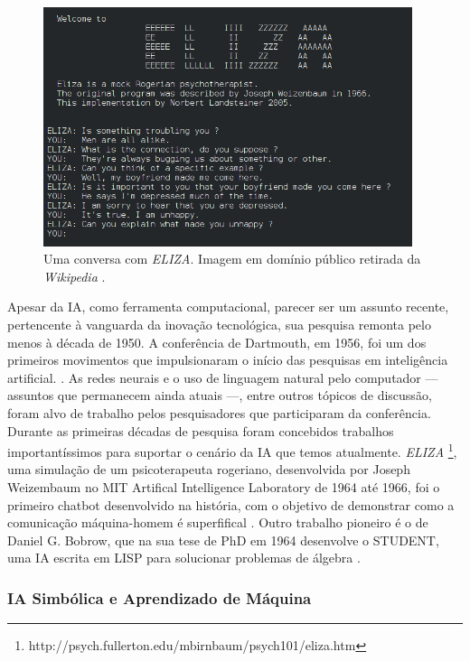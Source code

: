 \documentclass[12pt, a4paper]{article}
\begin{document}
\begin{figure}[ht!]
	\centering
	\includegraphics[width=\textwidth, height=7cm, keepaspectratio=true]{fig/eliza}
	\caption{
		Uma conversa com \emph{ELIZA}. Imagem em domínio público retirada da \emph{Wikipedia}
		\cite{wikipedia_eliza}.
	}
\end{figure}

Apesar da IA, como ferramenta computacional, parecer ser um assunto recente, 
pertencente à vanguarda da inovação tecnológica, sua pesquisa
remonta pelo menos à década de 1950.
A conferência de Dartmouth, em 1956, foi um dos primeiros movimentos que impulsionaram o início das 
pesquisas em inteligência artificial. \cite{dartmouth}.
As redes neurais e o uso de linguagem natural pelo computador --- assuntos que permanecem ainda atuais ---, entre outros tópicos de discussão,
foram alvo de trabalho pelos pesquisadores que participaram da conferência. 
Durante as primeiras décadas de pesquisa foram concebidos trabalhos importantíssimos para suportar o cenário da IA que temos atualmente.
\emph{ELIZA} \footnote{http://psych.fullerton.edu/mbirnbaum/psych101/eliza.htm}, 
uma simulação de um psicoterapeuta rogeriano, desenvolvida por Joseph Weizembaum no MIT Artifical Intelligence Laboratory de 1964 até 1966,
foi o primeiro chatbot desenvolvido na história, com o objetivo de demonstrar como a comunicação máquina-homem é superfifical \cite{wiezembaum}.
Outro trabalho pioneiro é o de Daniel G. Bobrow, que na sua tese de PhD em 1964 desenvolve o STUDENT, uma IA escrita em LISP para solucionar problemas
de álgebra \cite{student}.

\subsubsection{IA Simbólica e Aprendizado de Máquina}
\end{document}
